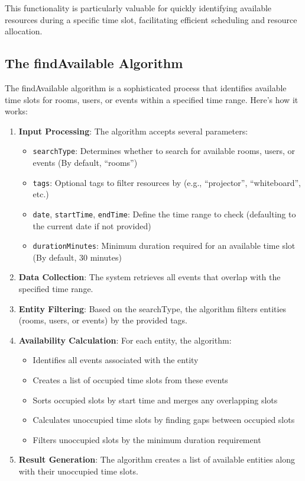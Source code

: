 This functionality is particularly valuable for quickly identifying available resources during a specific time slot, facilitating efficient scheduling and resource allocation.

\subsection{The findAvailable Algorithm}\label{subsec:findavailable-algorithm}

The findAvailable algorithm is a sophisticated process that identifies available time slots for rooms, users, or events within a specified time range.
Here's how it works:

\begin{enumerate}
    \item \textbf{Input Processing}: The algorithm accepts several parameters:
    \begin{itemize}
        \item \texttt{searchType}: Determines whether to search for available rooms, users, or events (By default, ``rooms'')
        \item \texttt{tags}: Optional tags to filter resources by (e.g., ``projector'', ``whiteboard'', etc.)
        \item \texttt{date}, \texttt{startTime}, \texttt{endTime}: Define the time range to check (defaulting to the current date if not provided)
        \item \texttt{durationMinutes}: Minimum duration required for an available time slot (By default, 30 minutes)
    \end{itemize}

    \item \textbf{Data Collection}: The system retrieves all events that overlap with the specified time range.

    \item \textbf{Entity Filtering}: Based on the searchType, the algorithm filters entities (rooms, users, or events) by the provided tags.

    \item \textbf{Availability Calculation}: For each entity, the algorithm:
    \begin{itemize}
        \item Identifies all events associated with the entity
        \item Creates a list of occupied time slots from these events
        \item Sorts occupied slots by start time and merges any overlapping slots
        \item Calculates unoccupied time slots by finding gaps between occupied slots
        \item Filters unoccupied slots by the minimum duration requirement
    \end{itemize}

    \item \textbf{Result Generation}: The algorithm creates a list of available entities along with their unoccupied time slots.
\end{enumerate}

